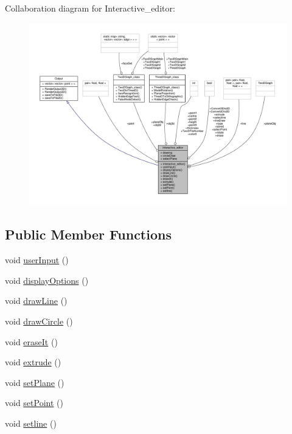 Collaboration diagram for Interactive\+\_\+editor\+:
\nopagebreak
\begin{figure}[H]
\begin{center}
\leavevmode
\includegraphics[width=350pt]{classInteractive__editor__coll__graph}
\end{center}
\end{figure}
\subsection*{Public Member Functions}
\begin{DoxyCompactItemize}
\item 
void \hyperlink{classInteractive__editor_aa7d472e169eed213d1fcb874c6f5a6cd}{user\+Input} ()
\item 
void \hyperlink{classInteractive__editor_a8078ec1404bdd80e09320d14d198f628}{display\+Options} ()
\item 
void \hyperlink{classInteractive__editor_a30310b574f37f50f7d40e2acebf93723}{draw\+Line} ()
\item 
void \hyperlink{classInteractive__editor_a630465bba8474cf03efb3e0716009e1f}{draw\+Circle} ()
\item 
void \hyperlink{classInteractive__editor_a29bd8d4ac9bff675360a661ab9f04db4}{erase\+It} ()
\item 
void \hyperlink{classInteractive__editor_a6543fe863fa4a902fb4dd71cf6318533}{extrude} ()
\item 
void \hyperlink{classInteractive__editor_a1332966f87d6df07b217ed663105379b}{set\+Plane} ()
\item 
void \hyperlink{classInteractive__editor_a21c3f807f2e892c9b40cae987593e2cb}{set\+Point} ()
\item 
void \hyperlink{classInteractive__editor_acf3e55ad6b947af72b83d996f409c176}{setline} ()
\end{DoxyCompactItemize}
